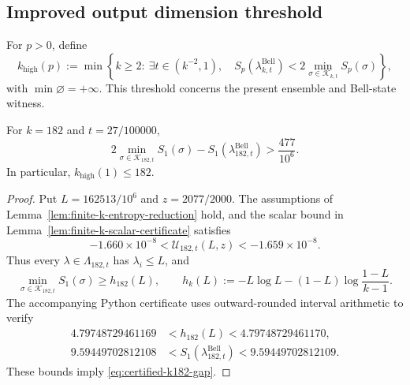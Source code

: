 
\subsection{Improved output dimension threshold}

For $p>0$, define
\begin{equation}
 k_{\mathrm{high}}(p)
 :=\min\left\{k\geq2:\ \exists t\in(k^{-2},1),\quad
 S_p(\lambda^{\mathrm{Bell}}_{k,t})
 <2\min_{\sigma\in\mathscr K_{k,t}}S_p(\sigma)\right\},
 \label{eq:k-high-def}
\end{equation}
with $\min\varnothing=+\infty$. This threshold concerns the present
ensemble and Bell-state witness.

\begin{proposition}
\label{prop:certified-k182}
For $k=182$ and $t=27/100000$,
\begin{equation}
 2\min_{\sigma\in\mathscr K_{182,t}}S_1(\sigma)
 -S_1(\lambda^{\mathrm{Bell}}_{182,t})
 >\frac{477}{10^6}.
 \label{eq:certified-k182-gap}
\end{equation}
In particular, $k_{\mathrm{high}}(1)\leq182$.
\end{proposition}

\begin{proof}
Put $L=162513/10^6$ and $z=2077/2000$. The assumptions of
Lemma~\ref{lem:finite-k-entropy-reduction} hold, and the scalar bound in
Lemma~\ref{lem:finite-k-scalar-certificate} satisfies
\begin{equation}
 -1.660\times10^{-8}
 <\mathcal U_{182,t}(L,z)<-1.659\times10^{-8}.
\end{equation}
Thus every $\lambda\in\Lambda_{182,t}$ has $\lambda_i\leq L$, and
\begin{equation}
 \min_{\sigma\in\mathscr K_{182,t}}S_1(\sigma)
 \geq h_{182}(L),\qquad
 h_k(L):=-L\log L-(1-L)\log\frac{1-L}{k-1}.
\end{equation}
The accompanying Python certificate uses outward-rounded interval
arithmetic to verify
\begin{align}
 4.79748729461169
 &<h_{182}(L)<4.79748729461170,\\
 9.59449702812108
 &<S_1(\lambda^{\mathrm{Bell}}_{182,t})<9.59449702812109.
\end{align}
These bounds imply \eqref{eq:certified-k182-gap}.
\end{proof}

